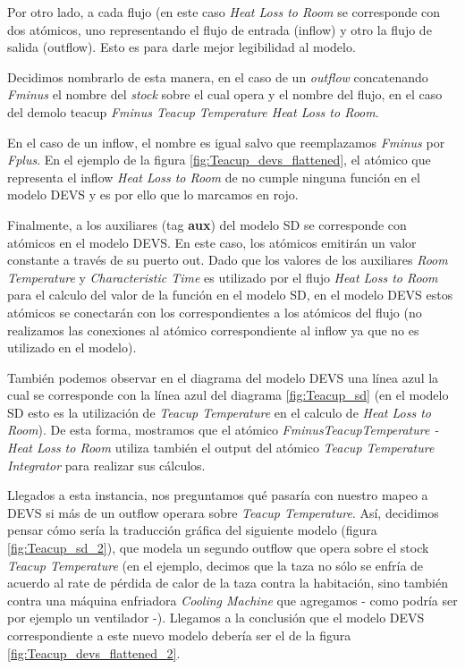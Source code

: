 Por otro lado, a cada flujo (en este caso \textit{Heat Loss to Room} se corresponde con dos atómicos, uno representando el flujo de entrada (inflow) y otro la flujo de salida (outflow). Esto es para darle mejor legibilidad al modelo.

Decidimos nombrarlo de esta manera, en el caso de un \textit{outflow} concatenando \textit{Fminus} el nombre del \textit{stock} sobre el cual opera y el nombre del flujo, en el caso del demolo teacup \textit{Fminus Teacup Temperature Heat Loss to Room}.

En el caso de un inflow, el nombre es igual salvo que reemplazamos \textit{Fminus} por \textit{Fplus}. En el ejemplo de la figura \ref{fig:Teacup_devs_flattened}, el atómico que representa el inflow \textit{Heat Loss to Room} de no cumple ninguna función en el modelo DEVS y es por ello que lo marcamos en rojo. 

Finalmente, a los auxiliares (tag \textbf{aux}) del modelo SD se corresponde con atómicos en el modelo DEVS. En este caso, los atómicos emitirán un valor constante a través de su puerto out. Dado que los valores de los auxiliares \textit{Room Temperature} y \textit{Characteristic Time} es utilizado por el flujo \textit{Heat Loss to Room} para el calculo del valor de la función en el modelo SD, en el modelo DEVS estos atómicos se conectarán con los correspondientes a los atómicos del flujo (no realizamos las conexiones al atómico correspondiente al inflow ya que no es utilizado en el modelo).

También podemos observar en el diagrama del modelo DEVS una línea azul la cual se corresponde con la línea azul del diagrama \ref{fig:Teacup_sd} (en el modelo SD esto es la utilización de \textit{Teacup Temperature} en el calculo de \textit{Heat Loss to Room}). De esta forma, mostramos que el atómico \textit{FminusTeacupTemperature - Heat Loss to Room} utiliza también el output del atómico \textit{Teacup Temperature Integrator} para realizar sus cálculos. 

Llegados a esta instancia, nos preguntamos qué pasaría con nuestro mapeo a DEVS si más de un outflow operara sobre \textit{Teacup Temperature}. Así, decidimos pensar cómo sería la traducción gráfica del siguiente modelo (figura \ref{fig:Teacup_sd_2}), que modela un segundo outflow que opera sobre el stock \textit{Teacup Temperature} (en el ejemplo, decimos que la taza no sólo se enfría de acuerdo al rate de pérdida de calor de la taza contra la habitación, sino también contra una máquina enfriadora \textit{Cooling Machine} que agregamos - como podría ser por ejemplo un ventilador -). Llegamos a la conclusión que el modelo DEVS correspondiente a este nuevo modelo debería ser el de la figura \ref{fig:Teacup_devs_flattened_2}. 

